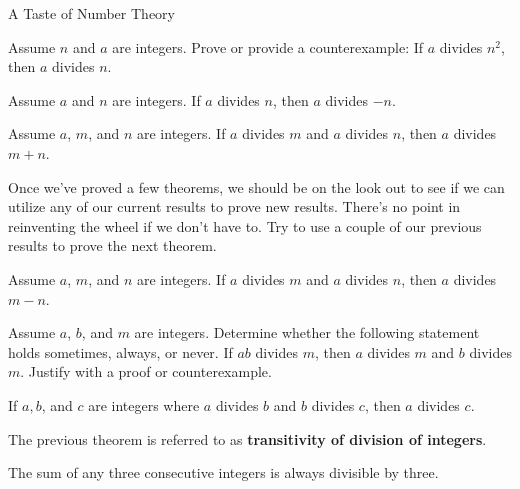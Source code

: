 \begin{section}{A Taste of Number Theory}
\begin{problem}
Assume $n$ and $a$ are integers.  Prove or provide a counterexample:  If $a$ divides $n^2$, then $a$ divides $n$.
\end{problem}

\begin{theorem}
Assume $a$ and $n$ are integers. If $a$ divides $n$, then $a$ divides $-n$. 
\end{theorem}

\begin{theorem}
Assume $a$, $m$, and $n$ are integers. If $a$ divides $m$ and $a$ divides $n$, then $a$ divides $m+n$. 
\end{theorem}

Once we've proved a few theorems, we should be on the look out to see if we can utilize any of our current results to prove new results.  There's no point in reinventing the wheel if we don't have to.  Try to use a couple of our previous results to prove the next theorem.

\begin{theorem}
Assume $a$, $m$, and $n$ are integers. If $a$ divides $m$ and $a$ divides $n$, then $a$ divides $m-n$.
\end{theorem}

\begin{problem}
Assume $a$, $b$, and $m$ are integers. Determine whether the following statement holds sometimes, always, or never.  If $ab$ divides $m$, then $a$ divides $m$ and $b$ divides $m$.  Justify with a proof or counterexample.
\end{problem}

\begin{theorem}
If $a, b$, and $c$ are integers where $a$ divides $b$ and $b$ divides $c$, then $a$ divides $c$.
\end{theorem}

The previous theorem is referred to as \textbf{transitivity of division of integers}.

\begin{theorem}
The sum of any three consecutive integers is always divisible by three.\end{theorem}

\end{section}